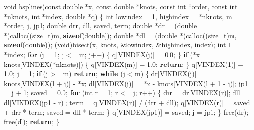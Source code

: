 \documentclass[
  12pt,
]{article}
\newenvironment{Shaded}{\begin{snugshade}}{\end{snugshade}}
\newcommand{\ControlFlowTok}[1]{\textcolor[rgb]{0.13,0.29,0.53}{\textbf{#1}}}
\newcommand{\DataTypeTok}[1]{\textcolor[rgb]{0.13,0.29,0.53}{#1}}
\newcommand{\DecValTok}[1]{\textcolor[rgb]{0.00,0.00,0.81}{#1}}
\newcommand{\FloatTok}[1]{\textcolor[rgb]{0.00,0.00,0.81}{#1}}
\newcommand{\KeywordTok}[1]{\textcolor[rgb]{0.13,0.29,0.53}{\textbf{#1}}}
\newcommand{\NormalTok}[1]{#1}
\begin{document}
\begin{Shaded}
\begin{Highlighting}[]
\DataTypeTok{void}\NormalTok{ bsplines(}\DataTypeTok{const} \DataTypeTok{double}\NormalTok{ *x, }\DataTypeTok{const} \DataTypeTok{double}\NormalTok{ *knots, }\DataTypeTok{const} \DataTypeTok{int}\NormalTok{ *order,}
              \DataTypeTok{const} \DataTypeTok{int}\NormalTok{ *nknots, }\DataTypeTok{int}\NormalTok{ *index, }\DataTypeTok{double}\NormalTok{ *q) \{}
    \DataTypeTok{int}\NormalTok{ lowindex = }\DecValTok{1}\NormalTok{, highindex = *nknots, m = *order, j, jp1;}
    \DataTypeTok{double}\NormalTok{ drr, dll, saved, term;}
    \DataTypeTok{double}\NormalTok{ *dr = (}\DataTypeTok{double}\NormalTok{ *)calloc((}\DataTypeTok{size\_t}\NormalTok{)m, }\KeywordTok{sizeof}\NormalTok{(}\DataTypeTok{double}\NormalTok{));}
    \DataTypeTok{double}\NormalTok{ *dl = (}\DataTypeTok{double}\NormalTok{ *)calloc((}\DataTypeTok{size\_t}\NormalTok{)m, }\KeywordTok{sizeof}\NormalTok{(}\DataTypeTok{double}\NormalTok{));}
\NormalTok{    (}\DataTypeTok{void}\NormalTok{)bisect(x, knots, \&lowindex, \&highindex, index);}
    \DataTypeTok{int}\NormalTok{ l = *index;}
    \ControlFlowTok{for}\NormalTok{ (j = }\DecValTok{1}\NormalTok{; j \textless{}= m; j++) \{}
\NormalTok{        q[VINDEX(j)] = }\FloatTok{0.0}\NormalTok{;}
\NormalTok{    \}}
    \ControlFlowTok{if}\NormalTok{ (*x == knots[VINDEX(*nknots)]) \{}
\NormalTok{        q[VINDEX(m)] = }\FloatTok{1.0}\NormalTok{;}
        \ControlFlowTok{return}\NormalTok{;}
\NormalTok{    \}}
\NormalTok{    q[VINDEX(}\DecValTok{1}\NormalTok{)] = }\FloatTok{1.0}\NormalTok{;}
\NormalTok{    j = }\DecValTok{1}\NormalTok{;}
    \ControlFlowTok{if}\NormalTok{ (j \textgreater{}= m) }\ControlFlowTok{return}\NormalTok{;}
    \ControlFlowTok{while}\NormalTok{ (j \textless{} m) \{}
\NormalTok{        dr[VINDEX(j)] = knots[VINDEX(l + j)] {-} *x;}
\NormalTok{        dl[VINDEX(j)] = *x {-} knots[VINDEX(l + }\DecValTok{1}\NormalTok{ {-} j)];}
\NormalTok{        jp1 = j + }\DecValTok{1}\NormalTok{;}
\NormalTok{        saved = }\FloatTok{0.0}\NormalTok{;}
        \ControlFlowTok{for}\NormalTok{ (}\DataTypeTok{int}\NormalTok{ r = }\DecValTok{1}\NormalTok{; r \textless{}= j; r++) \{}
\NormalTok{            drr = dr[VINDEX(r)];}
\NormalTok{            dll = dl[VINDEX(jp1 {-} r)];}
\NormalTok{            term = q[VINDEX(r)] / (drr + dll);}
\NormalTok{            q[VINDEX(r)] = saved + drr * term;}
\NormalTok{            saved = dll * term;}
\NormalTok{        \}}
\NormalTok{        q[VINDEX(jp1)] = saved;}
\NormalTok{        j = jp1;}
\NormalTok{    \}}
\NormalTok{    free(dr);}
\NormalTok{    free(dl);}
    \ControlFlowTok{return}\NormalTok{;}
\NormalTok{\}}


\end{Highlighting}
\end{Shaded}
\end{document}
